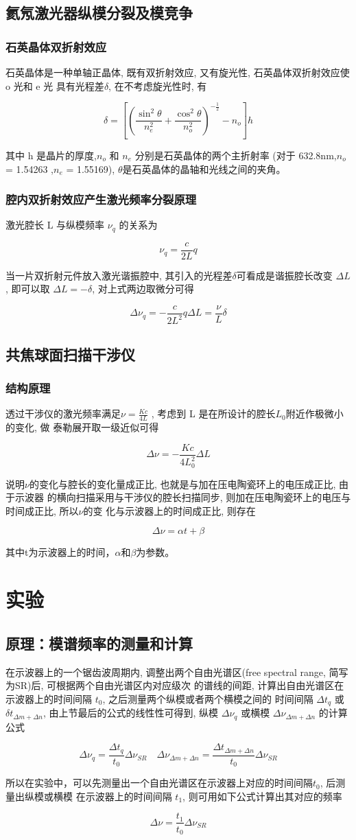 \documentclass[12pt,a4paper]{article}
\newcommand{\be}[1]{
    \begin{equation}
        #1
    \end{equation}
}
\begin{document}
\subsection{氦氖激光器纵模分裂及模竞争}
\subsubsection{石英晶体双折射效应}
石英晶体是一种单轴正晶体, 既有双折射效应, 又有旋光性, 石英晶体双折射效应使 o 光和 e 光
具有光程差$\delta$, 在不考虑旋光性时, 有
\be{\delta=\left[\left(\frac{\sin ^{2} \theta}{n_{e}^{2}}+\frac{\cos ^{2} \theta}{n_{o}^{2}}\right)^{-\frac{1}{2}}-n_{o}\right] h}
其中 h 是晶片的厚度,$n_o$ 和 $n_e$ 分别是石英晶体的两个主折射率 (对于 632.8nm,$n_o$ = 1.54263 ,$n_e$ =
1.55169), $\theta$是石英晶体的晶轴和光线之间的夹角。
\subsubsection{腔内双折射效应产生激光频率分裂原理}
激光腔长 L 与纵模频率 $\nu_q$ 的关系为
\be{\nu_q=\frac{c}{2 L}q}
当一片双折射元件放入激光谐振腔中, 其引入的光程差$\delta$可看成是谐振腔长改变 $\Delta L$, 即可以取
$\Delta L=-\delta$, 对上式两边取微分可得
\be{\Delta \nu_{q}=-\frac{c}{2 L^{2}} q \Delta L=\frac{\nu}{L} \delta}
\subsection{共焦球面扫描干涉仪}
\subsubsection{结构原理}
透过干涉仪的激光频率满足$\nu=\frac{K c }{4 L}$
, 考虑到 L 是在所设计的腔长$L_0$附近作极微小的变化, 做
泰勒展开取一级近似可得
\be{\Delta \nu=-\frac{K c}{4 L_{0}^{2}} \Delta L}
说明$\nu$的变化与腔长的变化量成正比, 也就是与加在压电陶瓷环上的电压成正比, 由于示波器
的横向扫描采用与干涉仪的腔长扫描同步, 则加在压电陶瓷环上的电压与时间成正比, 所以$\nu$的变
化与示波器上的时间成正比, 则存在
\be{\Delta \nu=\alpha t+\beta}
其中t为示波器上的时间，$\alpha$和$\beta$为参数。
\section{实验}
\subsection{原理：模谱频率的测量和计算}
在示波器上的一个锯齿波周期内, 调整出两个自由光谱区(free spectral range, 简写为SR)后, 可根据两个自由光谱区内对应级次
的谱线的间距, 计算出自由光谱区在示波器上的时间间隔 $t_0$, 之后测量两个纵模或者两个横模之间的
时间间隔 $\Delta t_q$ 或 $\delta t_{\Delta m+\Delta n}$, 由上节最后的公式的线性性可得到, 纵模 $\Delta \nu_q$ 或横模 $\Delta \nu_{\Delta m+\Delta n}$ 的计算公式
\be{\Delta \nu_{q}=\frac{\Delta t_{q}}{t_{0}} \Delta \nu_{S R} \quad \Delta \nu_{\Delta m+\Delta n}=\frac{\Delta t_{\Delta m+\Delta n}}{t_{0}} \Delta \nu_{S R}}
所以在实验中，可以先测量出一个自由光谱区在示波器上对应的时间间隔$ t_0$, 后测量出纵模或横模
在示波器上的时间间隔 $t_1$, 则可用如下公式计算出其对应的频率
\be{\Delta \nu=\frac{t_{1}}{t_{0}} \Delta \nu_{S R}}
\end{document}
